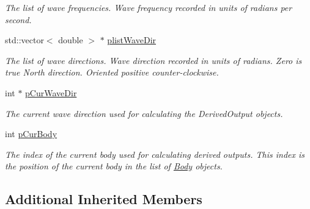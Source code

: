 \begin{DoxyCompactItemize}
\begin{DoxyCompactList}\small\item\em The list of wave frequencies. Wave frequency recorded in units of radians per second. \end{DoxyCompactList}\item 
\hypertarget{classosea_1_1ofreq_1_1_output_derived_af552007def83b95df23524d02bbe0d56}{std\-::vector$<$ double $>$ $\ast$ \hyperlink{classosea_1_1ofreq_1_1_output_derived_af552007def83b95df23524d02bbe0d56}{plist\-Wave\-Dir}}\label{classosea_1_1ofreq_1_1_output_derived_af552007def83b95df23524d02bbe0d56}

\begin{DoxyCompactList}\small\item\em The list of wave directions. Wave direction recorded in units of radians. Zero is true North direction. Oriented positive counter-\/clockwise. \end{DoxyCompactList}\item 
\hypertarget{classosea_1_1ofreq_1_1_output_derived_a8c56d46309f2c0bef72485ae4d7077e4}{int $\ast$ \hyperlink{classosea_1_1ofreq_1_1_output_derived_a8c56d46309f2c0bef72485ae4d7077e4}{p\-Cur\-Wave\-Dir}}\label{classosea_1_1ofreq_1_1_output_derived_a8c56d46309f2c0bef72485ae4d7077e4}

\begin{DoxyCompactList}\small\item\em The current wave direction used for calculating the Derived\-Output objects. \end{DoxyCompactList}\item 
\hypertarget{classosea_1_1ofreq_1_1_output_derived_ae6f0acd108dfc56531d7b2cc0bd900eb}{int \hyperlink{classosea_1_1ofreq_1_1_output_derived_ae6f0acd108dfc56531d7b2cc0bd900eb}{p\-Cur\-Body}}\label{classosea_1_1ofreq_1_1_output_derived_ae6f0acd108dfc56531d7b2cc0bd900eb}

\begin{DoxyCompactList}\small\item\em The index of the current body used for calculating derived outputs. This index is the position of the current body in the list of \hyperlink{classosea_1_1ofreq_1_1_body}{Body} objects. \end{DoxyCompactList}\end{DoxyCompactItemize}
\subsection*{Additional Inherited Members}


